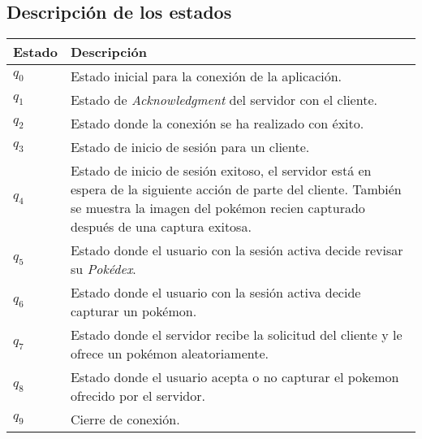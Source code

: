 \documentclass[12pt]{article}
\begin{document}
\begin{center}
\subsection{Descripción de los estados}
\begin{tabular}{|l|p{9cm}|}
  \hline
  Estado & Descripción \\
  \hline
  $q_0$ & Estado inicial para la conexión de la aplicación. \\ \hline
  $q_1$ & Estado de \textit{Acknowledgment} del servidor con el cliente. \\ \hline
  $q_2$ & Estado donde la conexión se ha realizado con éxito. \\ \hline
  $q_3$ & Estado de inicio de sesión para un cliente. \\ \hline
  $q_4$ & Estado de inicio de sesión exitoso, el servidor está en espera de la siguiente acción de parte del cliente. También se muestra la imagen del pokémon recien capturado después de una captura exitosa. \\ \hline
  $q_5$ & Estado donde el usuario con la sesión activa decide revisar su \textit{Pokédex}. \\ \hline
  $q_6$ & Estado donde el usuario con la sesión activa decide capturar un pokémon.\\ \hline
  $q_7$ & Estado donde el servidor recibe la solicitud del cliente y le ofrece un pokémon aleatoriamente.\\ \hline
  $q_8$ & Estado donde el usuario acepta o no capturar el pokemon ofrecido por el servidor.\\ \hline
  $q_9$ & Cierre de conexión. \\
  \hline
\end{tabular}
\end{center}
\newpage
\end{document}
